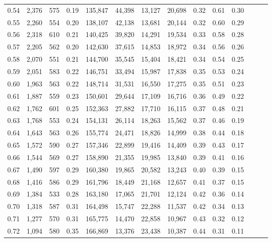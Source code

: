 \begin{tabular}{rrrrrrrrrrrrrr}
0.54 &  2,376 &  575 &  0.19 &  135,847 &   44,398 &  13,127 &  20,698 &  0.32 &  0.61 &      0.30 \\
0.55 &  2,260 &  554 &  0.20 &  138,107 &   42,138 &  13,681 &  20,144 &  0.32 &  0.60 &      0.29 \\
0.56 &  2,318 &  610 &  0.21 &  140,425 &   39,820 &  14,291 &  19,534 &  0.33 &  0.58 &      0.28 \\
0.57 &  2,205 &  562 &  0.20 &  142,630 &   37,615 &  14,853 &  18,972 &  0.34 &  0.56 &      0.26 \\
0.58 &  2,070 &  551 &  0.21 &  144,700 &   35,545 &  15,404 &  18,421 &  0.34 &  0.54 &      0.25 \\
0.59 &  2,051 &  583 &  0.22 &  146,751 &   33,494 &  15,987 &  17,838 &  0.35 &  0.53 &      0.24 \\
0.60 &  1,963 &  563 &  0.22 &  148,714 &   31,531 &  16,550 &  17,275 &  0.35 &  0.51 &      0.23 \\
0.61 &  1,887 &  559 &  0.23 &  150,601 &   29,644 &  17,109 &  16,716 &  0.36 &  0.49 &      0.22 \\
0.62 &  1,762 &  601 &  0.25 &  152,363 &   27,882 &  17,710 &  16,115 &  0.37 &  0.48 &      0.21 \\
0.63 &  1,768 &  553 &  0.24 &  154,131 &   26,114 &  18,263 &  15,562 &  0.37 &  0.46 &      0.19 \\
0.64 &  1,643 &  563 &  0.26 &  155,774 &   24,471 &  18,826 &  14,999 &  0.38 &  0.44 &      0.18 \\
0.65 &  1,572 &  590 &  0.27 &  157,346 &   22,899 &  19,416 &  14,409 &  0.39 &  0.43 &      0.17 \\
0.66 &  1,544 &  569 &  0.27 &  158,890 &   21,355 &  19,985 &  13,840 &  0.39 &  0.41 &      0.16 \\
0.67 &  1,490 &  597 &  0.29 &  160,380 &   19,865 &  20,582 &  13,243 &  0.40 &  0.39 &      0.15 \\
0.68 &  1,416 &  586 &  0.29 &  161,796 &   18,449 &  21,168 &  12,657 &  0.41 &  0.37 &      0.15 \\
0.69 &  1,384 &  533 &  0.28 &  163,180 &   17,065 &  21,701 &  12,124 &  0.42 &  0.36 &      0.14 \\
0.70 &  1,318 &  587 &  0.31 &  164,498 &   15,747 &  22,288 &  11,537 &  0.42 &  0.34 &      0.13 \\
0.71 &  1,277 &  570 &  0.31 &  165,775 &   14,470 &  22,858 &  10,967 &  0.43 &  0.32 &      0.12 \\
0.72 &  1,094 &  580 &  0.35 &  166,869 &   13,376 &  23,438 &  10,387 &  0.44 &  0.31 &      0.11 \\

\end{tabular}
